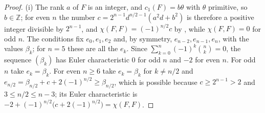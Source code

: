 \documentclass[11pt,reqno]{amsart}
\theoremstyle{plain}
\theoremstyle{definition}
\theoremstyle{remark}
\newcommand{\ZZ}{\mathbb{Z}}
\begin{document}
\begin{proof}
(i) The rank $a$ of $F$ is an integer, and $c_{1}(F)=b\theta$ with $\theta$
primitive, so $b\in\ZZ$; for even $n$ the number
$c=2^{n-1}d^{n/2-1}(a^{2}d+b^{2})$ is therefore a positive integer divisible
by $2^{n-1}$, and $\chi(F,F)=(-1)^{n/2}c$ by , while
$\chi(F,F)=0$ for odd $n$. The conditions fix $e_{0},e_{1},e_{2}$ and, by
symmetry, $e_{n-2},e_{n-1},e_{n}$, with the values $\beta_{k}$; for $n=5$ these
are all the $e_{k}$. Since $\sum_{k=0}^{n}(-1)^{k}\binom{n}{k}=0$, the
sequence $(\beta_{k})$ has Euler characteristic $0$ for odd $n$ and $-2$ for
even $n$. For odd $n$ take $e_{k}=\beta_{k}$. For even $n\ge6$ take
$e_{k}=\beta_{k}$ for $k\ne n/2$ and
$e_{n/2}=\beta_{n/2}+c+2(-1)^{n/2}\ge\beta_{n/2}$, which is possible because
$c\ge2^{n-1}>2$ and $3\le n/2\le n-3$; its Euler characteristic is
$-2+(-1)^{n/2}\bigl(c+2(-1)^{n/2}\bigr)=\chi(F,F)$.


\end{proof}
\end{document}
